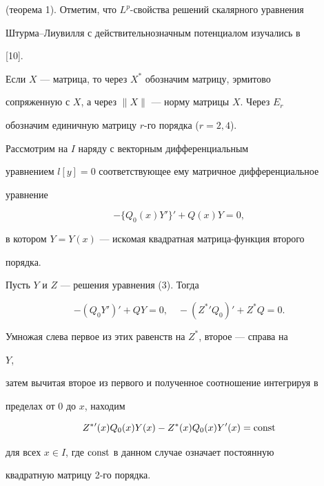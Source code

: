 (теорема 1). Отметим, что $L^p$-свойства решений скалярного уравнения 


Штурма--Лиувилля с действительнозначным потенциалом изучались в 


[10]. 


 


Если $X$ --- матрица, то через $X^*$ обозначим матрицу, эрмитово 


сопряженную с $X$, а через $\|X\|$ --- норму матрицы $X$. Через $E_r$ 


обозначим единичную матрицу $r$-го порядка ($r=2,4$). 


 


Рассмотрим на $I$ наряду с векторным дифференциальным 


уравнением $l[y]=0$ соответствующее ему матричное дифференциальное 


уравнение 


\begin{equation} 


-\{Q_0(x)Y'\}'+Q(x)Y=0, 


\end{equation} 


в котором $Y=Y(x)$ --- искомая квадратная матрица-функция второго 


порядка. 


 


Пусть $Y$ и $Z$ --- решения уравнения (3). Тогда 


$$ 


-(Q_0Y')'+Q Y=0,\quad 


-(Z^*{}'Q_0)'+Z^*Q=0. 


$$ 


Умножая слева первое из этих равенств на $Z^*$, второе --- справа на 


$Y$, 


затем вычитая второе из первого и полученное соотношение интегрируя в 


пределах от $0$ до $x$, находим 


\begin{equation} 


Z^*{}'(x)Q_0(x)Y(x)-Z^*(x)Q_0(x)Y'(x)=\const 


\end{equation} 


для всех $x\in I$, где $\operatorname{const}$ в данном случае означает постоянную 


квадратную матрицу 2-го порядка. 



